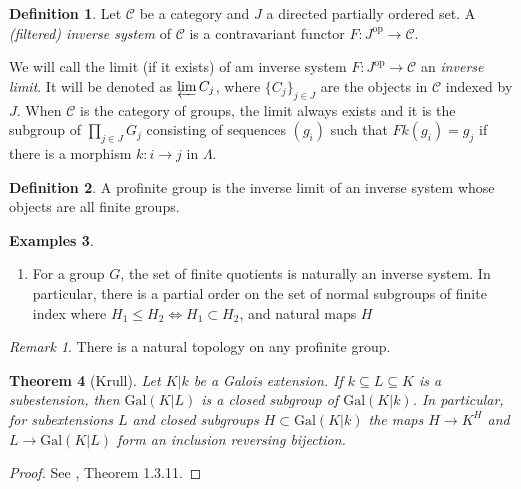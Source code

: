 \documentclass{article}
\newtheorem{theorem}{Theorem}[section]
\theoremstyle{definition}
\newtheorem{definition}[theorem]{Definition}
\newtheorem{examples}[theorem]{Examples}
\theoremstyle{remark}
\newtheorem*{remark}{Remark}
\newcommand{\mc}[1]{\mathcal{#1}}
\begin{document}
\begin{definition}
	Let $\mc{C}$ be a category and $J$ a directed partially ordered set. A \textit{(filtered) inverse system} of $\mc{C}$ is a contravariant functor $F: J^{\text{op}} \to \mc{C}$.
\end{definition}

We will call the limit (if it exists) of am inverse system $F: J^{\text{op}} \to \mc{C}$ an \textit{inverse limit}.
It will be denoted as $\varprojlim C_{j}$, where $\{C_j\}_{j \in J}$ are the objects in $\mc{C}$ indexed by $J$.
When $\mc{C}$ is the category of groups, the limit always exists and it is the subgroup of $\prod_{j \in J} G_j$ consisting of sequences $(g_i)$ such that $Fk(g_i) = g_j$ if there is a morphism $k: i  \to j$ in $\Lambda$.

\begin{definition}
	A profinite group is the inverse limit of an inverse system whose objects are all finite groups.
\end{definition}

\begin{examples} \text{}
\begin{enumerate}
	\item For a group $G$, the set of finite quotients is naturally an inverse system.
		In particular, there is a partial order on the set of normal subgroups of finite index where $H_1 \leq H_2 \Longleftrightarrow H_1 \subset H_2$, and natural maps $H$
\end{enumerate}
\end{examples}

\begin{remark}
	There is a natural topology on any profinite group.
\end{remark}

\begin{theorem}[Krull]
	Let $K | k$ be a Galois extension.
	If $k \subseteq L \subseteq K$ is a subestension, then $\text{Gal}(K|L)$ is a closed subgroup of $\text{Gal}(K|k)$.
	In particular, for subextensions $L$ and closed subgroups $H \subset \text{Gal}(K|k)$ the maps $H \to K^H$ and $L \to \text{Gal}(K|L)$ form an inclusion reversing bijection.
\end{theorem}

\begin{proof}
	See \cite{Szamuely}, Theorem 1.3.11. 
\end{proof}
\end{document}
